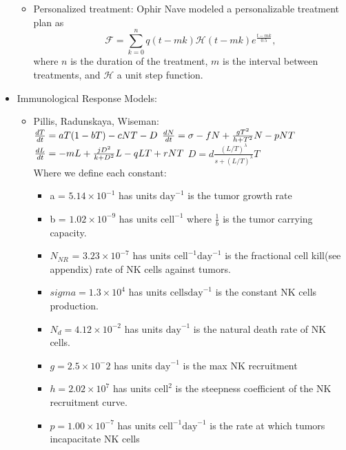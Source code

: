 \documentclass[11pt]{amsart}
\begin{document}
\begin{itemize}
\begin{itemize}
			\item Personalized treatment: Ophir Nave modeled a personalizable treatment plan as 
				\begin{equation}
					\mathscr{F} = \sum_{k=0}^n q(t-mk) \mathscr{H} (t-mk)e^{\frac{t-mk}{0.5}}\label{eq: NavePersonalChemo},
				\end{equation}
				where $n$ is the duration of the treatment, $m$ is the interval between treatments, and $\mathscr{H}$ a unit step function.
		\end{itemize}
	\item Immunological Response Models:
		\begin{itemize}
			\item Pillis, Radunskaya, Wiseman:\\
                    			$\frac{dT}{dt} = aT(1-bT) - cNT - D\\$
                    			$\frac{dN}{dt} = \sigma - fN +\frac{gT^2}{h + T^2}N - pNT\\$
                    			$\frac{dL}{dt} = - mL +\frac{jD^2}{k + D^2}L - qLT + rNT\\$
                    			$D = d\frac{(L/T)^\lambda}{s + (L/T)^\lambda}T$\\
                    		Where we define each constant:
                   		 \begin{itemize}
                    			\item a = $5.14 \times 10^{-1}$ has units $\text{day}^{-1}$ is the tumor growth rate
                    			\item b = $1.02 \times 10^{-9}$ has units $\text{cell}^{-1}$ where  $\frac{1}{b}$ is the tumor carrying capacity.
                   		 	\item $N_{NR}$ = $3.23 \times 10^{-7}$ has units $\text{cell}^{-1}\text{day}^{-1}$ is the fractional cell kill(see appendix) rate of NK cells against tumors.  
                   		 	\item $sigma = 1.3 \times 10^4$ has units $\text{cells} \text{day}^{-1}$ is the constant NK cells production.
                   		 	\item $N_d = 4.12 \times 10^{-2}$ has units $\text{day}^{-1}$ is the natural death rate of NK cells.
                   		 	\item $g = 2.5 \times 10^-2$ has units $\text{day}^{-1}$ is the max NK recruitment
                   		 	\item $h = 2.02 \times 10^7$ has units $\text{cell}^2$ is the steepness coefficient of the NK recruitment curve.
                   		 	\item $p = 1.00 \times 10^{-7}$ has units $\text{cell}^{-1}\text{day}^{-1}$ is the rate at which tumors incapacitate NK cells

\end{itemize}
\end{itemize}
\end{itemize}
\end{document}
